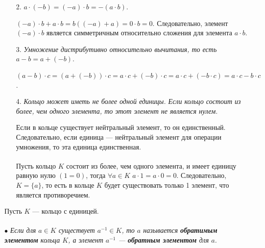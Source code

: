 \begin{enumerate}
	\item[2.] $a\cdot (-b) = (-a)\cdot b = -(a\cdot b)$.
	\begin{Proof}
		$(-a)\cdot b + a\cdot b = b((-a) + a) = 0\cdot b = 0$. Следовательно, элемент $(-a)\cdot b$ является симметричным относительно сложения для элемента $a\cdot b$.
	\end{Proof}
	\item[3.] \textit{Умножение дистрибутивно относительно вычитания, то есть} $a-b = a + (-b)$.\begin{Proof}
		$(a-b)\cdot c = (a + (-b))\cdot c = a\cdot c + (-b)\cdot c = a\cdot c + (-b\cdot c) = a\cdot c - b\cdot c$.
	\end{Proof}
	\item[4.] \textit{Кольцо может иметь не более одной единицы. Если кольцо состоит из более, чем одного элемента, то этот элемент не является нулем.}
	\begin{Proof}
		Если в кольце существует нейтральный элемент, то он
		единственный. Следовательно, если единица --- нейтральный элемент для операции умножения, то эта единица единственная.\\\\
		Пусть кольцо $K$ состоит из более, чем одного элемента, и имеет единицу равную нулю $(1 = 0)$, тогда $\forall a \in K$ $a\cdot 1 = a\cdot 0 = 0$. Следовательно, $K = \{a\}$, то есть в кольце $K$ будет существовать только 1 элемент, что является противоречием.
	\end{Proof}
\end{enumerate}
Пусть $K$ --- кольцо с единицей.\\\\
$\bullet$ \textit{Если для $a\in K$ существует $a^{-1}\in K$, то $a$ называется \textbf{обратимым элементом} кольца $K$, а элемент $a^{-1}$ --- \textbf{обратным элементом} для $a$.}
